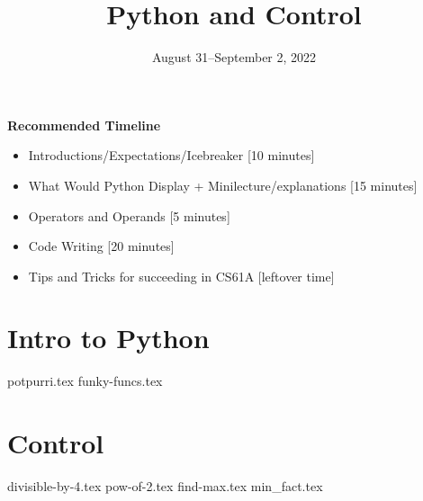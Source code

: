 \documentclass{exam}
\title{Python and Control}
\date{August 31--September 2, 2022}
\begin{document}
\maketitle
\begin{guide}
\textbf{Recommended Timeline}
\begin{itemize}
  \item Introductions/Expectations/Icebreaker [10 minutes]
  \item What Would Python Display + Minilecture/explanations [15 minutes]
  \item Operators and Operands [5 minutes]
  \item Code Writing [20 minutes]
  \item Tips and Tricks for succeeding in CS61A [leftover time]
\end{itemize}
\end{guide}


\section{Intro to Python}
\begin{questions}
{potpurri.tex}
{funky-funcs.tex}
\end{questions}

\section{Control}
\begin{questions}
{divisible-by-4.tex}
{pow-of-2.tex}
{find-max.tex}
{min_fact.tex}
\end{questions}
\end{document}
